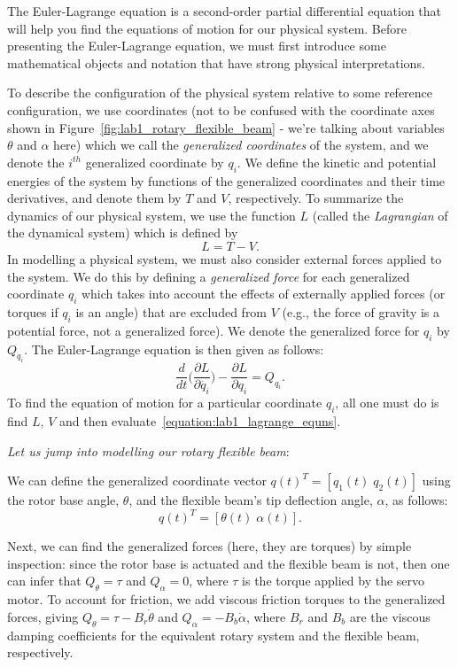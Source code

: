 \documentclass[12pt]{report}
\begin{document}
The Euler-Lagrange equation is a second-order partial differential equation that will help you find the equations of motion for our physical system. Before presenting the Euler-Lagrange equation, we must first introduce some mathematical objects and notation that have strong physical interpretations.

To describe the configuration of the physical system relative to some reference configuration, we use coordinates (not to be confused with the coordinate axes shown in Figure~\ref{fig:lab1_rotary_flexible_beam} - we're talking about variables $\theta$ and $\alpha$ here) which we call the \emph{generalized coordinates} of the system, and we denote the $i^{th}$ generalized coordinate by $q_i$. We define the kinetic and potential energies of the system by functions of the generalized coordinates and their time derivatives, and denote them by $T$ and $V$, respectively. To summarize the dynamics of our physical system, we use the function $L$ (called the \emph{Lagrangian} of the dynamical system) which is defined by
\[
    L=T-V.
\]
In modelling a physical system, we must also consider external forces applied to the system. We do this by defining a \emph{generalized force} for each generalized coordinate $q_i$ which takes into account the effects of externally applied forces (or torques if $q_i$ is an angle) that are excluded from $V$ (e.g., the force of gravity is a potential force, not a generalized force). We denote the generalized force for $q_i$ by $Q_{q_i}$.
The Euler-Lagrange equation is then given as follows:
\begin{equation}\label{equation:lab1_lagrange_equns}
    \frac{d}{dt} \Bigg(\frac{\partial L}{\partial \dot{q_i}}\Bigg)  - \frac{\partial L}{\partial q_i} = Q_{q_i}.
\end{equation}
To find the equation of motion for a particular coordinate $q_i$, all one must do is find $L$, $V$ and then evaluate~\eqref{equation:lab1_lagrange_equns}.

\emph{Let us jump into modelling our rotary flexible beam}:

We can define the generalized coordinate vector $q(t)^T=[q_1(t) \; q_2(t)]$ using the rotor base angle, $\theta$, and the flexible beam's tip deflection angle, $\alpha$, as follows:
\[
    q(t)^T=[\theta(t) \; \alpha(t)].
\]

Next, we can find the generalized forces (here, they are torques) by simple inspection: since the rotor base is actuated and the flexible beam is not, then one can infer that $Q_\theta = \tau$ and $Q_\alpha = 0$, where $\tau$ is the torque applied by the servo motor. To account for friction, we add viscous friction torques to the generalized forces, giving $Q_\theta = \tau - B_r \dot{\theta}$ and $Q_\alpha = -B_b \dot{\alpha}$, where $B_r$ and $B_b$ are the viscous damping coefficients for the equivalent rotary system and the flexible beam, respectively.
\end{document}
